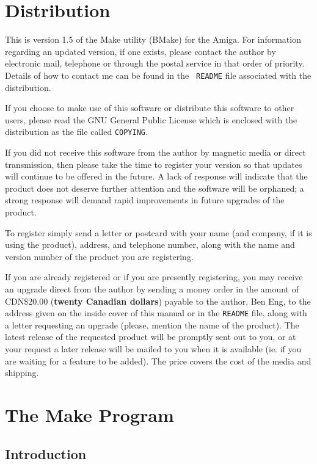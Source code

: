 \chapter{Distribution}

This is version 1.5 of the Make utility (BMake) for the Amiga.  For
information regarding an updated version, if one exists, please contact the
author by electronic mail, telephone or through the postal service in that
order of priority.  Details of how to contact me can be found in the {\tt
README} file associated with the distribution.

If you choose to make use of this software or distribute this software to
other users, please read the GNU General Public License which is enclosed
with the distribution as the file called {\tt COPYING}.

If you did not receive this software from the author by magnetic media or
direct transmission, then please take the time to register your version
so that updates will continue to be offered in the future.  A lack of
response will indicate that the product does not deserve further attention
and the software will be orphaned; a strong response will demand rapid
improvements in future upgrades of the product.

To register simply send a letter or postcard with your name (and company,
if it is using the product), address, and telephone number, along with the
name and version number of the product you are registering.

If you are already registered or if you are presently registering, you may
receive an upgrade direct from the author by sending a money order in the
amount of CDN\$20.00 ({\bf twenty Canadian dollars}) payable to the author,
Ben Eng, to the address given on the inside cover of this manual or in the
{\tt README} file, along with a letter requesting an upgrade (please,
mention the name of the product).  The latest release of the requested
product will be promptly sent out to you, or at your request a later
release will be mailed to you when it is available (ie.  if you are waiting
for a feature to be added).  The price covers the cost of the media and
shipping.


\chapter{The Make Program}

\section{Introduction}

